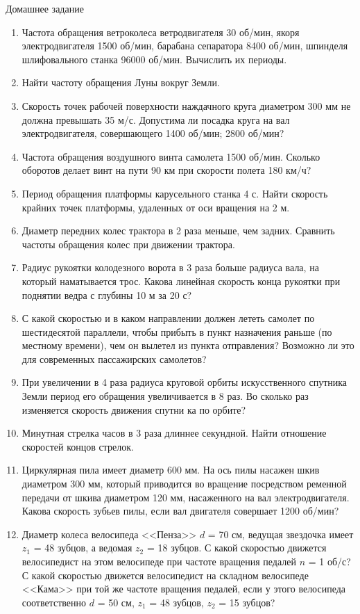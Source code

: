 \documentclass[a5paper, 10pt]{diss_4}
\renewcommand{\'}{\,'}
\begin{document}
\begin{center}
   Домашнее задание
\end{center}
\begin{enumerate}
\item Частота обращения ветроколеса ветродвигателя 30 об/мин, якоря электродвигателя 1500 об/мин, барабана сепаратора 8400 об/мин, шпинделя шлифовального станка 96000 об/мин. Вычислить их периоды.
\item Найти частоту обращения Луны вокруг Земли.
\item Скорость точек рабочей поверхности наждачного  круга диаметром 300 мм не должна превышать 35 м/с. Допустима ли посадка круга на вал электродвигателя, совершающего 1400 об/мин; 2800 об/мин?
\item Частота обращения воздушного винта самолета 1500 об/мин. Сколько оборотов делает винт на пути 90 км при скорости полета 180 км/ч?
\item Период обращения платформы карусельного станка 4 с. Найти скорость крайних точек платформы, удаленных от оси вращения на 2 м.
\item Диаметр передних колес трактора в 2 раза меньше, чем задних. Сравнить частоты обращения колес при  движении трактора.
\item Радиус рукоятки колодезного ворота в 3 раза больше радиуса вала, на который наматывается трос. Какова  линейная скорость конца рукоятки при поднятии ведра с глубины 10 м за 20 с?
\item С какой скоростью и в каком направлении должен  лететь самолет по шестидесятой параллели, чтобы прибыть в пункт назначения раньше (по местному времени), чем он  вылетел из пункта отправления? Возможно ли это для  современных пассажирских самолетов?
\item При увеличении в 4 раза радиуса круговой орбиты искусственного спутника Земли период его обращения увеличивается в 8 раз. Во сколько раз изменяется скорость движения спутни ка по орбите?
\item Минутная стрелка часов в 3 раза длиннее секундной. Найти отношение скоростей концов стрелок.
\item Циркулярная пила имеет диаметр 600 мм. На ось пилы насажен шкив диаметром 300 мм, который  приводится во вращение посредством ременной передачи от шкива диаметром 120 мм, насаженного на вал электродвигателя.  Какова скорость зубьев пилы, если вал двигателя совершает 1200 об/мин?
\item Диаметр колеса велосипеда <<Пенза>> $d$ = 70 см,  ведущая звездочка имеет $z_1$ = 48 зубцов, а ведомая $z_2$ = 18 зубцов. С какой скоростью движется велосипедист на этом велосипеде при частоте вращения педалей $n$ = 1 об/с? С какой скоростью движется велосипедист на складном велосипеде <<Кама>> при той же частоте вращения педалей, если у этого велосипеда  соответственно $d$ = 50 см, $z_1$ = 48 зубцов, $z_2$ = 15 зубцов?

\end{enumerate}
\end{document}
